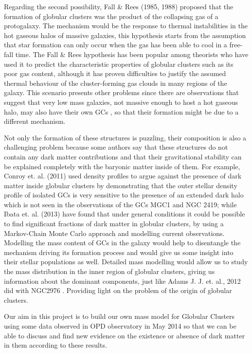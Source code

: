 Regarding the second possibility, Fall \& Rees (1985, 1988) proposed that the formation of globular clusters was the product of the collapsing gas of a protogalaxy. The mechanism would be the response to thermal instabilities in the hot gaseous halos of massive galaxies, this hypothesis starts from the assumption that star formation can only occur when the gas has been able to cool in a free-fall time. The Fall \& Rees hypothesis has been popular among theorists who have used it to predict the characteristic properties of globular clusters such as its poor gas content, although it has proven difficulties to justify the assumed thermal behaviour of the cluster-forming gas clouds in many regions of the galaxy. This scenario presents other problems since there are observations that suggest that very low mass galaxies, not massive enough to host a hot gaseous halo, may also have their own GCs \cite{10}, so that their formation might be due to a different mechanism.

Not only the formation of these structures is puzzling, their composition is also a challenging problem because some authors say that these structures do not contain any dark matter contributions and that their gravitational stability can be explained completely with the baryonic matter inside of them. For example, Conroy et. al. (2011) used density profiles to argue against the presence of dark matter inside globular clusters by demonstrating that the outer stellar density profile of isolated GCs is
very sensitive to the presence of an extended dark halo which is not seen in the observations of the GCs MGC1 and NGC 2419; while Ibata et. al. (2013) \cite{5} have found that under general conditions it could be possible to find significant fractions of dark matter in globular clusters, by using a Markov-Chain Monte Carlo approach and modelling current observations. Modelling the mass content of GCs in the galaxy would help to disentangle the mechanism driving its formation process and would give us some insight into their stellar populations as well. Detailed mass modelling would allow us to study the mass distribution in the inner region of globular clusters, giving us information about the dominant components, just like Adams J. J. et. al., 2012 did with NGC2976 \cite{6}. Providing light on the problem of the origin of globular clusters.

Our aim in this project is to build our own mass model for Globular Clusters using some data observed in OPD observatory in May 2014 so that we can be able to discuss and find new evidence on the existence or absence of dark matter in them according to these results. 

